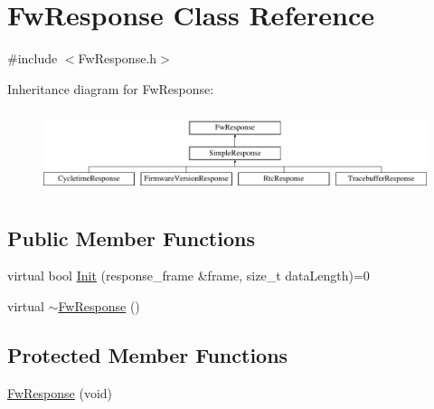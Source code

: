 \hypertarget{class_fw_response}{\section{Fw\-Response Class Reference}
\label{class_fw_response}
}


{\ttfamily \#include $<$Fw\-Response.\-h$>$}

Inheritance diagram for Fw\-Response\-:\begin{figure}[H]
\begin{center}
\leavevmode
\includegraphics[height=2.441860cm]{class_fw_response}
\end{center}
\end{figure}
\subsection*{Public Member Functions}
\begin{DoxyCompactItemize}
\item 
virtual bool \hyperlink{class_fw_response_a610d3fe6c0bc3709192b0d137999a3d0}{Init} (response\-\_\-frame \&frame, size\-\_\-t data\-Length)=0
\item 
virtual \hyperlink{class_fw_response_aed8ebca2bfa9c6bad03ba1865eacdf37}{$\sim$\-Fw\-Response} ()
\end{DoxyCompactItemize}
\subsection*{Protected Member Functions}
\begin{DoxyCompactItemize}
\item 
\hyperlink{class_fw_response_a35a961d9f67f965d3b692af20db5cc21}{Fw\-Response} (void)
\end{DoxyCompactItemize}


